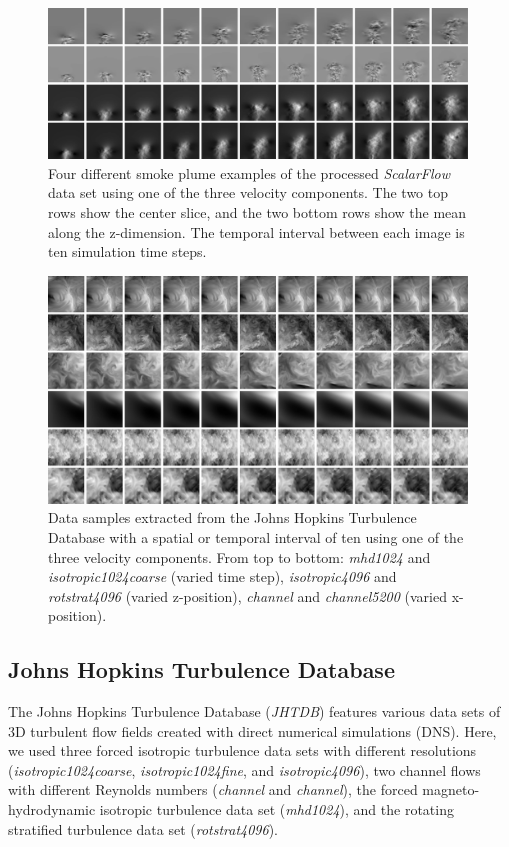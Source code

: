 \begin{figure}[hp]
    \centering
    \includegraphics[width=0.99\textwidth]{ImagesDatasets/ScalarFlowDefault_small}
    \caption{Four different smoke plume examples of the processed \textit{ScalarFlow} data set using one of the three velocity components. The two top rows show the center slice, and the two bottom rows show the mean along the z-dimension. The temporal interval between each image is ten simulation time steps.}
    \label{fig: scalarFlow example}
\end{figure}

\begin{figure}[hp]
    \centering
    \includegraphics[width=0.99\textwidth]{ImagesDatasets/JHTDBDefault_small}
    \caption{Data samples extracted from the Johns Hopkins Turbulence Database with a spatial or temporal interval of ten using one of the three velocity components. From top to bottom: \textit{mhd1024} and \textit{isotropic1024coarse} (varied time step), \textit{isotropic4096} and \textit{rotstrat4096} (varied z-position), \textit{channel} and \textit{channel5200} (varied x-position).}
    \label{fig: jhtdb example}
\end{figure}


\subsection{Johns Hopkins Turbulence Database}
The Johns Hopkins Turbulence Database (\textit{JHTDB}) \citep{perlman2007} features various data sets of 3D turbulent flow fields created with direct numerical simulations (DNS). Here, we used three forced isotropic turbulence data sets with different resolutions (\textit{isotropic1024coarse}, \textit{isotropic1024fine}, and \textit{isotropic4096}), two channel flows with different Reynolds numbers (\textit{channel} and \textit{channel}), the forced magneto-hydrodynamic isotropic turbulence data set (\textit{mhd1024}), and the rotating stratified turbulence data set (\textit{rotstrat4096}).

